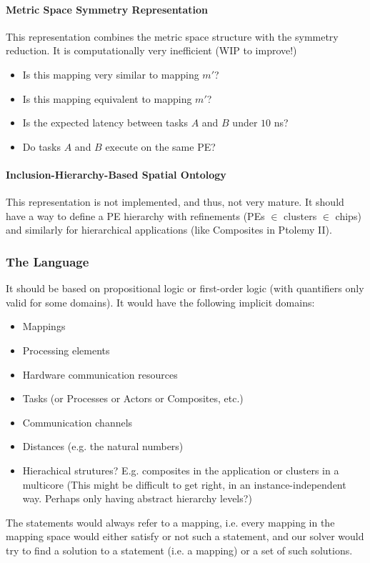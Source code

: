 \paragraph{Metric Space Symmetry Representation}
This representation combines the metric space structure with the symmetry reduction. It is computationally very inefficient (WIP to improve!)
\begin{itemize}
\item Is this mapping very similar to mapping $m'$? 
\item Is this mapping equivalent to mapping $m'$?
\item Is the expected latency between tasks $A$ and $B$ under $10$ ns?
\item Do tasks $A$ and $B$ execute on the same PE?
\end{itemize}

\paragraph{Inclusion-Hierarchy-Based Spatial Ontology}
This representation is not implemented, and thus, not very mature.
It should have a way to define a PE hierarchy with refinements (PEs $\in$ clusters $\in$ chips) and similarly for hierarchical applications (like Composites in Ptolemy II).

\subsubsection{The Language}
It should be based on propositional logic or first-order logic (with quantifiers only valid for some domains).
It would have the following implicit domains:
\begin{itemize}
\item Mappings
\item Processing elements
\item Hardware communication resources
\item Tasks (or Processes or Actors or Composites, etc.)
\item Communication channels
\item Distances (e.g. the natural numbers)
\item Hierachical strutures? E.g. composites in the application or clusters in a multicore (This might be difficult to get right, in an instance-independent way. Perhaps only having abstract hierarchy levels?)
\end{itemize}

The statements would always refer to a mapping, i.e. every mapping in the mapping space would either satisfy or not such a statement, and our solver would try to find a solution to a statement (i.e. a mapping) or a set of such solutions.


